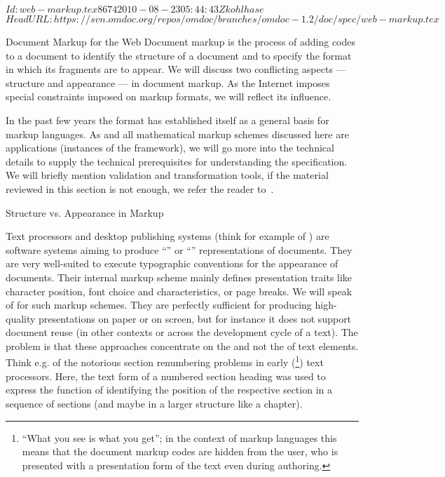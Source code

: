 \svnInfo $Id: web-markup.tex 8674 2010-08-23 05:44:43Z kohlhase $
\svnKeyword $HeadURL: https://svn.omdoc.org/repos/omdoc/branches/omdoc-1.2/doc/spec/web-markup.tex $

\begin{tchapter}[id=markup-web]{Document Markup for the Web}
Document markup is the process of adding codes to a document to identify the
structure of a document and to specify the format in which its fragments are to
appear. We will discuss two conflicting aspects --- structure and appearance ---
in document markup. As the Internet imposes special constraints imposed on markup
formats, we will reflect its influence.

In the past few years the {\xml} format has established itself as a general basis for
markup languages. As {\omdoc} and all mathematical markup schemes discussed here are
{\xml} applications (instances of the {\xml}
framework), we will go more into the technical details to supply
the technical prerequisites for understanding the specification.  We will briefly mention
{\xml} validation and transformation tools, if the material reviewed in this section is
not enough, we refer the reader to~\cite{Harold:xb01}.

\begin{tsection}[id=markup-types]{Structure vs. Appearance in Markup}

  Text processors and desktop publishing systems (think for example of
  {}) are software systems aiming to produce
  ``{}'' or ``{}'' representations of documents.
  They are very well-suited to execute typographic conventions for the appearance of
  documents. Their internal markup scheme mainly defines presentation traits like
  character position, font choice and characteristics, or page breaks.  We will speak of
  {} for such markup schemes.  They are perfectly sufficient
  for producing high-quality presentations on paper or on screen, but for instance it does
  not support document reuse (in other contexts or across the development cycle of a
  text). The problem is that these approaches concentrate on the {} and not the
  {} of text elements.  Think e.g. of the notorious section renumbering
  problems in early ({}\footnote{``What you see is what you get''; in
    the context of markup languages this means that the document markup codes are hidden
    from the user, who is presented with a presentation form of the text even during
    authoring.}) text processors.  Here, the text form of a numbered section heading was
  used to express the function of identifying the position of the respective section in a
  sequence of sections (and maybe in a larger structure like a chapter).


\end{tsection}
\end{tchapter}
